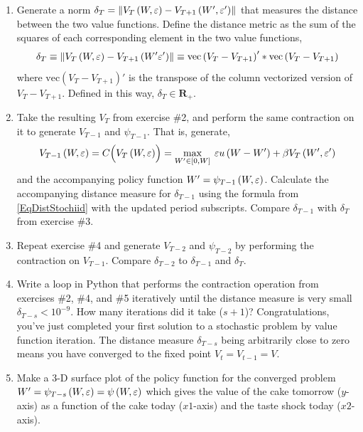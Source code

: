 \begin{problem}
\begin{enumerate}
   \item Generate a norm $\delta_T = \left\lVert V_T\left(W,\varepsilon\right) - V_{T+1}\left(W',\varepsilon'\right)\right\rVert$ that measures the distance between the two value functions. Define the distance metric as the sum of the squares of each corresponding element in the two value functions,
   \begin{equation}\label{EqDistStochiid}
      \delta_T \equiv \left\lVert V_T\left(W,\varepsilon\right) - V_{T+1}\left(W'\varepsilon'\right)\right\rVert \equiv \text{vec}\left(V_T - V_{T+1}\right)'*\text{vec}\left(V_T - V_{T+1}\right)
   \end{equation}
   where $\text{vec}\left(V_T-V_{T+1}\right)'$ is the transpose of the column vectorized version of $V_T-V_{T+1}$. Defined in this way, $\delta_T\in\mathbf{R}_+$.

   \item Take the resulting $V_T$ from exercise \#2, and perform the same contraction on it to generate $V_{T-1}$ and $\psi_{T-1}$. That is, generate,
   \begin{equation*}
      V_{T-1}\left(W,\varepsilon\right) = C\Bigl(V_T\left(W,\varepsilon\right)\Bigr) = \max_{W'\in[0,W]}\: \varepsilon u\left(W - W'\right) + \beta V_T\left(W',\varepsilon'\right)
   \end{equation*}
   and the accompanying policy function $W'=\psi_{T-1}\left(W,\varepsilon\right)$. Calculate the accompanying distance measure for $\delta_{T-1}$ using the formula from \eqref{EqDistStochiid} with the updated period subscripts. Compare $\delta_{T-1}$ with $\delta_T$ from exercise \#3.

   \item Repeat exercise \#4 and generate $V_{T-2}$ and $\psi_{T-2}$ by performing the contraction on $V_{T-1}$. Compare $\delta_{T-2}$ to $\delta_{T-1}$ and $\delta_{T}$.

   \item Write a loop in Python that performs the contraction operation from exercises \#2, \#4, and \#5 iteratively until the distance measure is very small $\delta_{T-s} < 10^{-9}$. How many iterations did it take ($s+1$)? Congratulations, you've just completed your first solution to a stochastic problem by value function iteration. The distance measure $\delta_{T-s}$ being arbitrarily close to zero means you have converged to the fixed point $V_{t} = V_{t-1} = V$.

   \item Make a 3-D surface plot of the policy function for the converged problem $W' = \psi_{T-s}\left(W,\varepsilon\right) = \psi\left(W,\varepsilon\right)$ which gives the value of the cake tomorrow ($y$-axis) as a function of the cake today ($x1$-axis) and the taste shock today ($x2$-axis).

\end{enumerate}
\end{problem}

